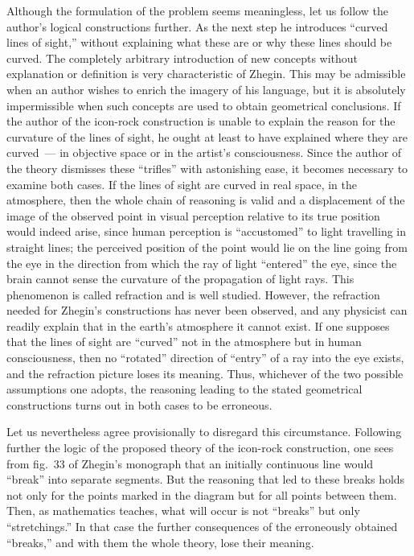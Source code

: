 {  Although the formulation of the problem seems meaningless, let us follow the
  author's logical constructions further.  As the next step he introduces ``curved
  lines of sight,'' without explaining what these are or why these lines should be
  curved.  The completely arbitrary introduction of new concepts without explanation
  or definition is very characteristic of Zhegin.  This may be admissible when an
  author wishes to enrich the imagery of his language, but it is absolutely
  impermissible when such concepts are used to obtain geometrical conclusions.  If the
  author of the icon-rock construction is unable to explain the reason for the
  curvature of the lines of sight, he ought at least to have explained where they are
  curved~--- in objective space or in the artist's consciousness.  Since the author of
  the theory dismisses these ``trifles'' with astonishing ease, it becomes necessary
  to examine both cases.  If the lines of sight are curved in real space, in the
  atmosphere, then the whole chain of reasoning is valid and a displacement of the
  image of the observed point in visual perception relative to its true position would
  indeed arise, since human perception is ``accustomed'' to light travelling in
  straight lines; the perceived position of the point would lie on the line going from
  the eye in the direction from which the ray of light ``entered'' the eye, since the
  brain cannot sense the curvature of the propagation of light rays.  This phenomenon
  is called refraction and is well studied.  However, the refraction needed for
  Zhegin's constructions has never been observed, and any physicist can readily
  explain that in the earth's atmosphere it cannot exist.  If one supposes that the
  lines of sight are ``curved'' not in the atmosphere but in human consciousness, then
  no ``rotated'' direction of ``entry'' of a ray into the eye exists, and the
  refraction picture loses its meaning.  Thus, whichever of the two possible
  assumptions one adopts, the reasoning leading to the stated geometrical constructions
  turns out in both cases to be erroneous.

  \smallskip
  Let us nevertheless agree provisionally to disregard this circumstance.  Following
  further the logic of the proposed theory of the icon-rock construction, one sees
  from fig.~33 of Zhegin's monograph that an initially continuous line would
  ``break'' into separate segments.  But the reasoning that led to these breaks holds
  not only for the points marked in the diagram but for all points between them.
  Then, as mathematics teaches, what will occur is not ``breaks'' but only
  ``stretchings.''  In that case the further consequences of the erroneously obtained
  ``breaks,'' and with them the whole theory, lose their meaning.

}
